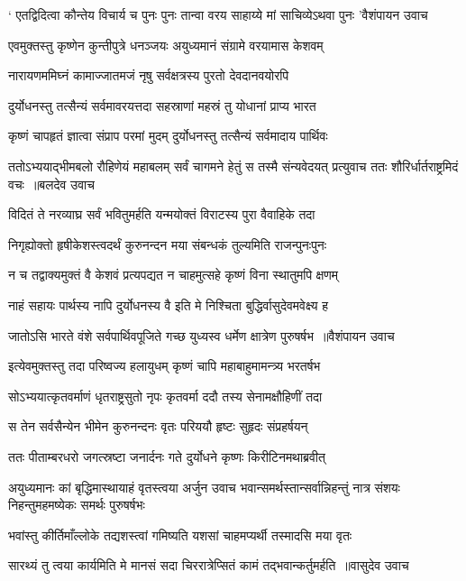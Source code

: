\threelineshloka
{` एतद्विदित्वा कौन्तेय विचार्य च पुनः पुनः}
{तान्वा वरय साहाय्ये मां साचिव्येऽथवा पुनः 'वैशंपायन उवाच}
{}


\twolineshloka
{एवमुक्तस्तु कृष्णेन कुन्तीपुत्रे धनञ्जयः}
{अयुध्यमानं संग्रामे वरयामास केशवम्}


\twolineshloka
{नारायणममिघ्नं कामाज्जातमजं नृषु}
{सर्वक्षत्रस्य पुरतो देवदानवयोरपि}


\twolineshloka
{दुर्योधनस्तु तत्सैन्यं सर्वमावरयत्तदा}
{सहस्राणां महस्रं तु योधानां प्राप्य भारत}


\twolineshloka
{कृष्णं चापहृतं ज्ञात्वा संप्राप परमां मुदम्}
{दुर्योधनस्तु तत्सैन्यं सर्वमादाय पार्थिवः}


\fourlineindentedshloka
{ततोऽभ्ययाद्भीमबलो रौहिणेयं महाबलम्}
{सर्वं चागमने हेतुं स तस्मै संन्यवेदयत्}
{प्रत्युवाच ततः शौरिर्धार्तराष्ट्रमिदं वचः ॥बलदेव उवाच}
{}


\twolineshloka
{विदितं ते नरव्याघ्र सर्वं भवितुमर्हति}
{यन्मयोक्तं विराटस्य पुरा वैवाहिके तदा}


\twolineshloka
{निगृह्योक्तो हृषीकेशस्त्वदर्थं कुरुनन्दन}
{मया संबन्धकं तुल्यमिति राजन्पुनःपुनः}


\twolineshloka
{न च तद्वाक्यमुक्तं वै केशवं प्रत्यपद्यत}
{न चाहमुत्सहे कृष्णं विना स्थातुमपि क्षणम्}


\twolineshloka
{नाहं सहायः पार्थस्य नापि दुर्योधनस्य वै}
{इति मे निश्चिता बुद्धिर्वासुदेवमवेक्ष्य ह}


\threelineshloka
{जातोऽसि भारते वंशे सर्वपार्थिवपूजिते}
{गच्छ युध्यस्व धर्मेण क्षात्रेण पुरुषर्षभ ॥वैशंपायन उवाच}
{}


\twolineshloka
{इत्येवमुक्तस्तु तदा परिष्वज्य हलायुधम्}
{कृष्णं चापि महाबाहुमामन्त्र्य भरतर्षभ}


\twolineshloka
{सोऽभ्ययात्कृतवर्माणं धृतराष्ट्रसुतो नृपः}
{कृतवर्मा ददौ तस्य सेनामक्षौहिणीं तदा}


\twolineshloka
{स तेन सर्वसैन्येन भीमेन कुरुनन्दनः}
{वृतः परिययौ हृष्टः सुहृदः संप्रहर्षयन्}


\twolineshloka
{ततः पीताम्बरधरो जगत्स्रष्टा जनार्दनः}
{गते दुर्योधने कृष्णः किरीटिनमथाब्रवीत्}


\fourlineindentedshloka
{अयुध्यमानः कां बृद्धिमास्थायाहं वृतस्त्वया}
{अर्जुन उवाच}
{भवान्समर्थस्तान्सर्वान्निहन्तुं नात्र संशयः}
{निहन्तुमहमष्येकः समर्थः पुरुषर्षभः}


\twolineshloka
{भवांस्तु कीर्तिमाँल्लोके तद्यशस्त्वां गमिष्यति}
{यशसां चाहमप्यर्थी तस्मादसि मया वृतः}


\threelineshloka
{सारथ्यं तु त्वया कार्यमिति मे मानसं सदा}
{चिररात्रेप्सितं कामं तद्भवान्कर्तुमर्हति ॥वासुदेव उवाच}
{}


